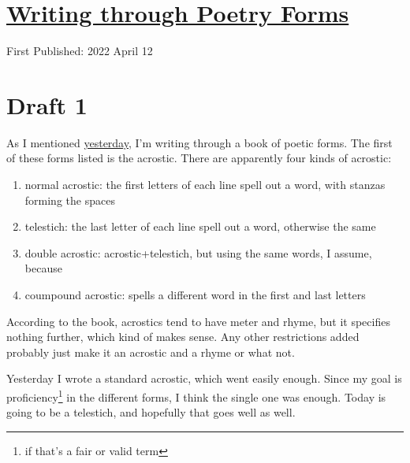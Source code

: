 \documentclass[12pt]{article}[titlepage]
\newcommand{\1}{\={a}}
\newcommand{\2}{\={e}}
\newcommand{\3}{\={\i}}
\newcommand{\4}{\=o}
\newcommand{\5}{\=u}
\newcommand{\6}{\={A}}
\renewcommand{\,}{\textsuperscript{,}}
\begin{document}
\doublespacing
\section{\href{poetry-forms-1.html}{Writing through Poetry Forms}}
First Published: 2022 April 12


\section{Draft 1}
As I mentioned \href{reflection-march-2022.html}{yesterday}, I'm writing through a book of poetic forms.
The first of these forms listed is the acrostic.
There are apparently four kinds of acrostic:
\begin{enumerate}
\item normal acrostic: the first letters of each line spell out a word, with stanzas forming the spaces
\item telestich: the last letter of each line spell out a word, otherwise the same
\item double acrostic: acrostic+telestich, but using the same words, I assume, because
\item coumpound acrostic: spells a different word in the first and last letters
\end{enumerate}
According to the book, acrostics tend to have meter and rhyme, but it specifies nothing further, which kind of makes sense.
Any other restrictions added probably just make it an acrostic and a rhyme or what not.

Yesterday I wrote a standard acrostic, which went easily enough.
Since my goal is proficiency\footnote{if that's a fair or valid term} in the different forms, I think the single one was enough.
Today is going to be a telestich, and hopefully that goes well as well.
\end{document}
